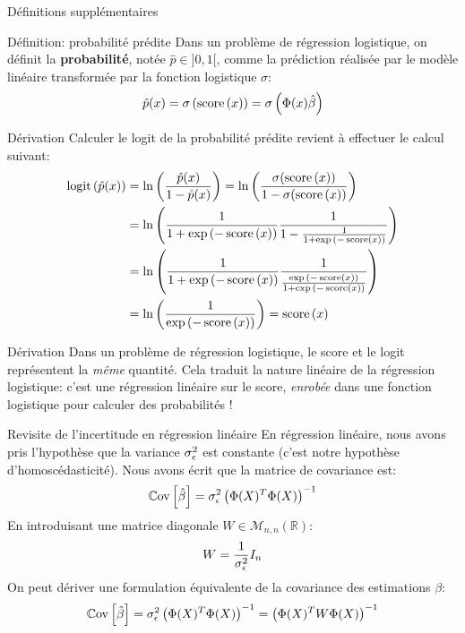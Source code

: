 \begin{frame}{Définitions supplémentaires}
	\begin{block}{Définition: probabilité prédite}
		Dans un problème de régression logistique, on définit la \textbf{probabilité}, notée $\hat{p} \in ]0, 1[$, comme la prédiction réalisée par le modèle linéaire transformée par la fonction logistique $\sigma$:
		\begin{equation}
			\hat{p}(x) = \sigma\left(\operatorname{score}\left(x\right)\right) = \sigma\left(\Phi(x) \hat{\beta}\right)
			\nonumber
		\end{equation}
	\end{block}
\end{frame}

\begin{frame}{Dérivation}
	Calculer le logit de la probabilité prédite revient à effectuer le calcul suivant:
	\begin{equation}
		\begin{aligned}
			\operatorname{logit}\left(\hat{p}(x)\right)
			&= \ln{\left(\frac{\hat{p}(x)}{1 - \hat{p}(x)}\right)}
			= \ln{\left(\frac{\sigma(\operatorname{score}\left(x\right))}{1 - \sigma(\operatorname{score}\left(x\right))}\right)} \\
			&= \ln{\left(\frac{1}{1 + \exp{(-\operatorname{score}\left(x\right))}} \frac{1}{1 - \frac{1}{1 + \exp{(-\operatorname{score}\left(x\right))}}}\right)} \\
			&= \ln{\left(\frac{1}{1 + \exp{(-\operatorname{score}\left(x\right))}} \frac{1}{\frac{\exp{(-\operatorname{score}\left(x\right))}}{1 + \exp{(-\operatorname{score}\left(x\right))}}}\right)} \\
			&= \ln{\left(\frac{1}{\exp{(-\operatorname{score}\left(x\right))}}\right)} = \operatorname{score}\left(x\right)
		\end{aligned}
		\nonumber
	\end{equation}
\end{frame}

\begin{frame}{Dérivation}
	Dans un problème de régression logistique, le score et le logit représentent la \textit{même} quantité. Cela traduit la nature linéaire de la régression logistique: c'est une régression linéaire sur le score, \textit{enrobée} dans une fonction logistique pour calculer des probabilités !
\end{frame}

\begin{frame}{Revisite de l'incertitude en régression linéaire}
	En régression linéaire, nous avons pris l'hypothèse que la variance $\sigma_{\epsilon}^2$ est constante (c'est notre hypothèse d'homoscédasticité). Nous avons écrit que la matrice de covariance est:
	\begin{equation}
		\operatorname{\mathbb{C}ov}\left[\hat{\beta}\right] = \sigma_{\epsilon}^2 \left(\Phi(X)^T \Phi(X)\right)^{-1}
		\nonumber
	\end{equation}
	En introduisant une matrice diagonale $W \in \mathcal{M}_{n,n}(\mathbb{R})$:
	\begin{equation}
		W = \frac{1}{\sigma_{\epsilon}^2} I_n
		\nonumber
	\end{equation}
	On peut dériver une formulation équivalente de la covariance des estimations $\beta$:
	\begin{equation}
		\operatorname{\mathbb{C}ov}\left[\hat{\beta}\right] = \sigma_{\epsilon}^2 \left(\Phi(X)^T \Phi(X)\right)^{-1} = \left(\Phi(X)^T W \Phi(X)\right)^{-1}
		\nonumber
	\end{equation}	
\end{frame}

